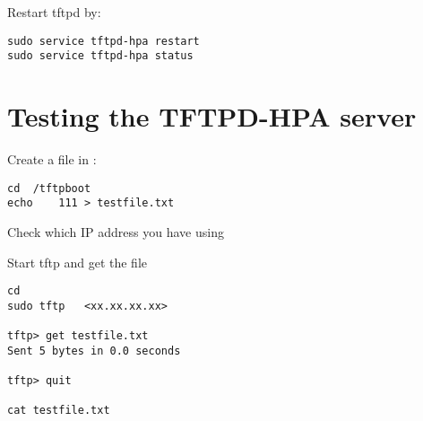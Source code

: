 Restart tftpd by:

\begin{verbatim}
sudo service tftpd-hpa restart
sudo service tftpd-hpa status
\end{verbatim}

\clearpage
\section{Testing the TFTPD-HPA server}

Create a file in :

\begin{verbatim}
cd	/tftpboot
echo	111	> testfile.txt
\end{verbatim}

Check which IP address you have using 

Start tftp and get the file

\begin{verbatim}
cd
sudo tftp	<xx.xx.xx.xx>

tftp> get testfile.txt
Sent 5 bytes in 0.0 seconds

tftp> quit

cat testfile.txt

\end{verbatim}


